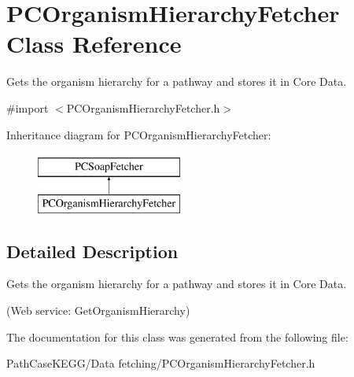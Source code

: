 \hypertarget{interface_p_c_organism_hierarchy_fetcher}{
\section{PCOrganismHierarchyFetcher Class Reference}
\label{interface_p_c_organism_hierarchy_fetcher}
}


Gets the organism hierarchy for a pathway and stores it in Core Data.  




{\ttfamily \#import $<$PCOrganismHierarchyFetcher.h$>$}

Inheritance diagram for PCOrganismHierarchyFetcher:\begin{figure}[h!]
\begin{center}
\leavevmode
\includegraphics[height=2.000000cm]{kegg_doc/interface_p_c_organism_hierarchy_fetcher}
\end{center}
\end{figure}


\subsection{Detailed Description}
Gets the organism hierarchy for a pathway and stores it in Core Data. 

(Web service: {\ttfamily GetOrganismHierarchy}) 

The documentation for this class was generated from the following file:\begin{DoxyCompactItemize}
\item 
PathCaseKEGG/Data fetching/PCOrganismHierarchyFetcher.h\end{DoxyCompactItemize}
